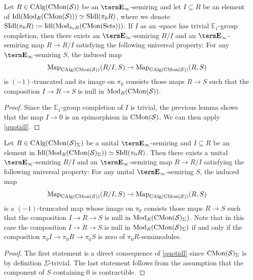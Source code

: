 \documentclass[10pt,a4paper,oneside]{article}
\begin{document}
\begin{thm}\label{thm:quotient-einf-semiring}
Let $R\in\operatorname{CAlg}(\operatorname{CMon}(\mathcal{S}))$ be an $\einf$-semiring and let $I\subseteq R$ be an element of $ \operatorname{Idl}(\operatorname{Mod}_{R}(\operatorname{CMon}(\mathcal{S})))\simeq \operatorname{SIdl}(\pi_0R)$, where we denote $\operatorname{SIdl}(\pi_0R):=\operatorname{Idl}(\operatorname{Mod}_{\pi_0R}(\operatorname{CMon}(\operatorname{Sets})))$. If $I$ as an \ein-space has trivial $\mathbb{E}_1$-group completion, then there exists an $\einf$-semiring $R/I$ and an $\einf$-semiring map $R\to R/I$ satisfying the following universal property: For any $\einf$-semiring $S$, the induced map $$\operatorname{Map}_{\operatorname{CAlg}(\operatorname{CMon}(\mathcal{S}))}(R/I,S)\to \operatorname{Map}_{\operatorname{CAlg}(\operatorname{CMon}(\mathcal{S}))}(R,S)$$ is $(-1)$-truncated and its image on $\pi_0$ consists those maps $R\to S$ such that the composition $I\to R\to S$ is null in $\operatorname{Mod}_R(\operatorname{CMon}(\mathcal{S}))$.
\end{thm}
\begin{proof}
Since the $\mathbb{E}_1$-group completion of $I$ is trivial, the previous lemma shows that the map $I\to 0$ is an epimorphism in $\operatorname{CMon}(\mathcal{S})$. We can then apply \cref{quotidl}.
\end{proof}

\begin{thm}\label{thm:quotient-unital-einf-semiring}
Let $R\in\operatorname{CAlg}(\operatorname{CMon}(\mathcal{S})_\Sigma)$ be a unital $\einf$-semiring and $I\subseteq R$ be an element in $ \operatorname{Idl}(\operatorname{Mod}_{R}(\operatorname{CMon}(\mathcal{S})_\Sigma))\simeq \operatorname{SIdl}(\pi_0R)$. Then there exists a unital $\einf$-semiring $R/I$ and an $\einf$-semiring map  $R\to R/I$ satisfying the following universal property: For any unital $\einf$-semiring $S$, the induced map $$\operatorname{Map}_{\operatorname{CAlg}(\operatorname{CMon}(\mathcal{S}))}(R/I,S)\to \operatorname{Map}_{\operatorname{CAlg}(\operatorname{CMon}(\mathcal{S}))}(R,S)$$ is a $(-1)$-truncated map whose image on $\pi_0$ consists those maps $R\to S$ such that the composition $I\to R\to S$ is null in $\operatorname{Mod}_R(\operatorname{CMon}(\mathcal{S})_\Sigma)$. Note that in this case the composition $I\to R\to S$ is null in $\operatorname{Mod}_R(\operatorname{CMon}(\mathcal{S})_\Sigma)$ if and only if the composition $\pi_0I\to \pi_0R\to \pi_0S$ is zero of $\pi_0R$-semimodules.
\end{thm}

\begin{proof}
The first statement is a direct consequence of \cref{quotidl} since $\operatorname{CMon}(\mathcal{S})_\Sigma$ is by definition $\Sigma$-trivial. The last statement follows from the assumption that the component of $S$ containing 0 is contractible.
\end{proof}
\end{document}
